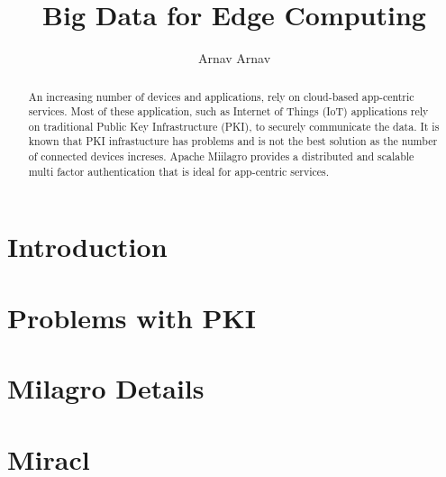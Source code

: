 
\title{Big Data for Edge Computing}


\author{Arnav Arnav}

\renewcommand{\shortauthors}{Arnav}


\begin{abstract}
An increasing number of devices and applications, rely on cloud-based
app-centric services. Most of these application, such as Internet of
Things (IoT) applications rely on traditional Public Key
Infrastructure (PKI), to securely communicate the data. It is known
that PKI infrastucture has problems and is not the best solution as
the number of connected devices increses.  Apache Miilagro provides a
distributed and scalable multi factor authentication that is ideal for
app-centric services.
\end{abstract}


\maketitle

\section{Introduction}


\section{Problems with PKI}

\section{Milagro Details}

\section{Miracl}

